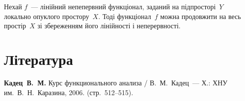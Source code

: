 \begin{theorem}
    \label{th:locally-convex-hahn-banach-theorem}
    Нехай $f$~--- лінійний непепервний функціонал, заданий на підпросторі~$Y$ локально опуклого простору~$X$. Тоді функціонал~$f$ можна продовжити на весь простір~$X$ зі збереженням його лінійності і неперервності.
\end{theorem}

\section{Література}

\begin{enumerate}[label={[\arabic*]}]
\item \textbf{Кадец~В.~М.}
Курс функционального анализа /
В.~М.~Кадец~---
Х.: ХНУ им.~В.~Н.~Каразина, 2006. (стр.~512--515).
\end{enumerate}
